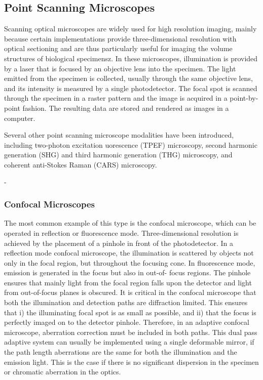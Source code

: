\cite{wide_MPFM}

\subsection{Point Scanning Microscopes}
\label{sec:PointScanningMicroscopes}

Scanning optical microscopes are widely used for high resolution imaging, 
mainly because certain implementations provide three-dimensional resolution 
with optical sectioning and are thus particularly useful for imaging the 
volume structures of biological specimensz. In these microscopes, 
illumination is provided by a laser that is focused by an objective lens into 
the specimen. The light emitted from the specimen is collected, usually 
through the same objective lens, and its intensity is measured by a single 
photodetector. The focal spot is scanned through the specimen in a raster 
pattern and the image is acquired in a point-by-point fashion. The resulting 
data are stored and rendered as images in a computer.

Several other point scanning microscope modalities have been introduced, 
including two-photon excitation uorescence (TPEF) microscopy, second harmonic 
generation (SHG) and third harmonic generation (THG) microscopy, and coherent 
anti-Stokes Raman (CARS) microscopy.

-
\subsubsection{Confocal Microscopes}
\label{sec:ConfocalMicroscopes}

The most common example of this type is the confocal microscope, which can be 
operated in reflection or fluorescence mode. Three-dimensional resolution is 
achieved by the placement of a pinhole in front of the photodetector. In a 
reflection mode confocal microscope, the illumination is scattered by objects 
not only in the focal region, but throughout the focusing cone. In 
fluorescence mode, emission is generated in the focus but also in out-of-
focus regions. The pinhole ensures that mainly light from the focal region 
falls upon the detector and light from out-of-focus planes is obscured. It is 
critical in the confocal microscope that both the illumination and detection 
paths are diffraction limited. This ensures that i) the illuminating focal 
spot is as small as possible, and ii) that the focus is perfectly imaged on 
to the detector pinhole. Therefore, in an adaptive confocal microscope, 
aberration correction must be included in both paths. This dual pass adaptive 
system can usually be implemented using a single deformable mirror, if the 
path length aberrations are the same for both the illumination and the 
emission light. This is the case if there is no significant dispersion in the 
specimen or chromatic aberration in the optics.

